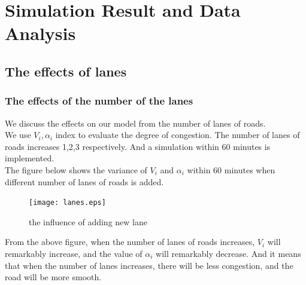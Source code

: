 \documentclass{mcmthesis}
\begin{document}
\section{Simulation Result and Data Analysis}
\subsection{The effects of lanes}
\subsubsection{The effects of the number of the lanes}
\label{lanes}
We discuss the effects on our model from the number of lanes of roads.\\
\indent We use $V_{i}, \alpha_{i}$ index to evaluate the degree of congestion. The number of lanes of roads increases 1,2,3 respectively. And a simulation within 60 minutes is implemented.\\
\indent The figure below shows the variance of $V_{i}$ and $\alpha_{i}$ within 60 minutes when different number of lanes of roads is added.\\
\begin{figure}[H]
	\centerline{\texttt{[image: lanes.eps]}}
	\caption{the influence of adding new lane}	
\end{figure}
\indent From the above figure, when the number of lanes of roads increases, $V_{i}$ will remarkably increase, and the value of $\alpha_{i}$ will remarkably decrease. And it means that when the number of lanes increases, there will be less congestion, and the road will be more smooth. 
\end{document}
